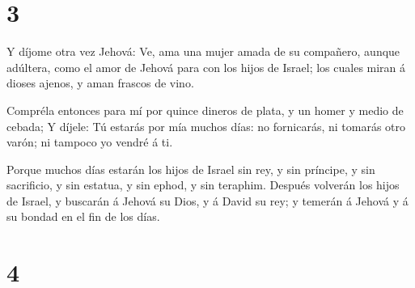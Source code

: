 \hypertarget{section-2}{%
\section{3}\label{section-2}}

 Y díjome otra vez Jehová: Ve, ama una mujer amada de su
compañero, aunque adúltera, como el amor de Jehová para con los hijos de
Israel; los cuales miran á dioses ajenos, y aman frascos de vino.

 Compréla entonces para mí por quince dineros de plata, y un
homer y medio de cebada;  Y díjele: Tú estarás por mía
muchos días: no fornicarás, ni tomarás otro varón; ni tampoco yo vendré
á ti.

 Porque muchos días estarán los hijos de Israel sin rey, y
sin príncipe, y sin sacrificio, y sin estatua, y sin ephod, y sin
teraphim.  Después volverán los hijos de Israel, y buscarán
á Jehová su Dios, y á David su rey; y temerán á Jehová y á su bondad en
el fin de los días.

\hypertarget{section-3}{%
\section{4}\label{section-3}}

